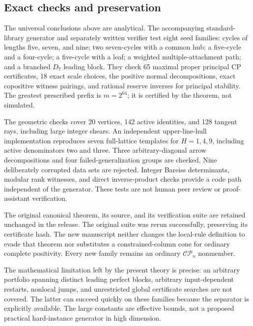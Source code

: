 \documentclass[11pt]{article}
\theoremstyle{definition}\newtheorem{definition}[theorem]{Definition}
\theoremstyle{remark}\newtheorem{remark}[theorem]{Remark}
\newcommand{\CP}{\mathcal{CP}}\newcommand{\COP}{\mathcal{COP}}\newcommand{\Ry}{\mathcal R}
\begin{document}
\subsection{Exact checks and preservation}
The universal conclusions above are analytical. The accompanying standard-library generator and separately written verifier test eight seed families: cycles of lengths five, seven, and nine; two seven-cycles with a common hub; a five-cycle and a four-cycle; a five-cycle with a leaf; a weighted multiple-attachment path; and a branched $D_7$ leading block. They check 65 maximal proper principal CP certificates, 18 exact scale choices, the positive normal decompositions, exact copositive witness pairings, and rational reserve inverses for principal stability. The greatest prescribed prefix is $m=2^{64}$; it is certified by the theorem, not simulated.

The geometric checks cover 20 vertices, 142 active identities, and 128 tangent rays, including large integer shears. An independent upper-line-hull implementation reproduces seven full-lattice templates for $H=1,4,9$, including active denominators two and three. Three arbitrary-diagonal arrow decompositions and four failed-generalization groups are checked. Nine deliberately corrupted data sets are rejected. Integer Bareiss determinants, modular rank witnesses, and direct inverse-product checks provide a code path independent of the generator. These tests are not human peer review or proof-assistant verification.

The original canonical theorem, its source, and its verification suite are retained unchanged in the release. The original suite was rerun successfully, preserving its certificate hash. The new manuscript neither changes the local-rule definition to evade that theorem nor substitutes a constrained-column cone for ordinary complete positivity. Every new family remains an ordinary $\CP_n$ nonmember.

The mathematical limitation left by the present theory is precise: an arbitrary portfolio spanning distinct leading perfect blocks, arbitrary input-dependent restarts, nonlocal jumps, and unrestricted global certificate searches are not covered. The latter can succeed quickly on these families because the separator is explicitly available. The large constants are effective bounds, not a proposed practical hard-instance generator in high dimension.
\end{document}
